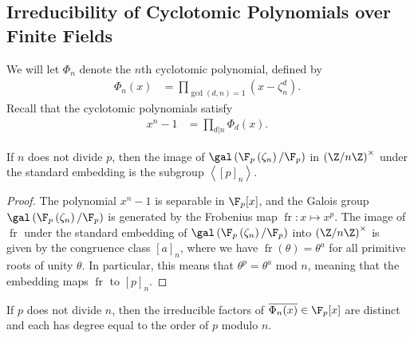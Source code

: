 \documentclass[10pt]{mypackage}
\begin{document}
\subsection{Irreducibility of Cyclotomic Polynomials over Finite Fields}%
We will let $\Phi_n$ denote the $n$th cyclotomic polynomial, defined by
\begin{align*}
  \Phi_n(x) &= \prod_{\gcd\left( d,n \right)=1} \left( x-\zeta_n^{d} \right).
\end{align*}
Recall that the cyclotomic polynomials satisfy
\begin{align*}
  x^{n}-1 &= \prod_{d | n} \Phi_d(x).
\end{align*}
\begin{theorem}
  If $n$ does not divide $p$, then the image of $ \gal\left( \F_p\left( \zeta_n \right)/\F_p \right) $ in $\left( \Z/n\Z \right)^{\times}$ under the standard embedding is the subgroup $ \left\langle \left[ p \right]_n \right\rangle $.
\end{theorem}
\begin{proof}
  The polynomial $x^{n}-1$ is separable in $\F_p[x]$, and the Galois group $\gal\left( \F_p\left( \zeta_n \right)/\F_p \right)$ is generated by the Frobenius map $\operatorname{fr}\colon x\mapsto x^{p}$. The image of $\operatorname{fr}$ under the standard embedding of $\gal\left( \F_p\left( \zeta_n \right)/\F_p \right)$ into $\left( \Z/n\Z \right)^{\times}$ is given by the congruence class $\left[ a \right]_n$, where we have $\operatorname{fr}\left( \theta \right) = \theta^{a}$ for all primitive roots of unity $\theta$. In particular, this means that $\theta^{p} = \theta^{a}$ mod $n$, meaning that the embedding maps $\operatorname{fr}$ to $\left[ p \right]_n$.
\end{proof}
\begin{theorem}
  If $p$ does not divide $n$, then the irreducible factors of $ \overline{\Phi_n(x)}\in \F_p[x] $ are distinct and each has degree equal to the order of $p$ modulo $n$.
\end{theorem}
\end{document}
